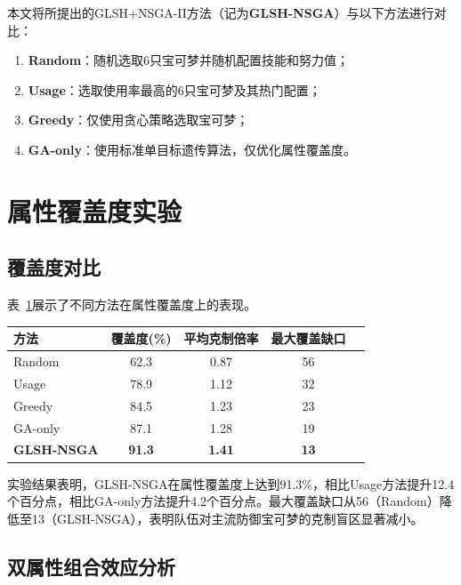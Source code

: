 本文将所提出的GLSH+NSGA-II方法（记为\textbf{GLSH-NSGA}）与以下方法进行对比：

\begin{enumerate}
    \item \textbf{Random}：随机选取6只宝可梦并随机配置技能和努力值；
    \item \textbf{Usage}：选取使用率最高的6只宝可梦及其热门配置；
    \item \textbf{Greedy}：仅使用贪心策略选取宝可梦\citep{chu2004tushu}；
    \item \textbf{GA-only}：使用标准单目标遗传算法\citep{walls2013drought}，仅优化属性覆盖度。
\end{enumerate}

\section{属性覆盖度实验}

\subsection{覆盖度对比}

表~\ref{tab:coverage-results}展示了不同方法在属性覆盖度上的表现。

\begin{table}[!htbp]
    \label{tab:coverage-results}
    \centering
    \footnotesize
    \begin{tabular}{lcccc}
        \hline
        方法 & 覆盖度(\%) & 平均克制倍率 & 最大覆盖缺口 \\
        \hline
        Random & 62.3 & 0.87 & 56 \\
        Usage & 78.9 & 1.12 & 32 \\
        Greedy & 84.5 & 1.23 & 23 \\
        GA-only & 87.1 & 1.28 & 19 \\
        \textbf{GLSH-NSGA} & \textbf{91.3} & \textbf{1.41} & \textbf{13} \\
        \hline
    \end{tabular}
\end{table}

实验结果表明，GLSH-NSGA在属性覆盖度上达到91.3\%，相比Usage方法提升12.4个百分点，相比GA-only方法提升4.2个百分点。最大覆盖缺口从56（Random）降低至13（GLSH-NSGA），表明队伍对主流防御宝可梦的克制盲区显著减小。

\subsection{双属性组合效应分析}

